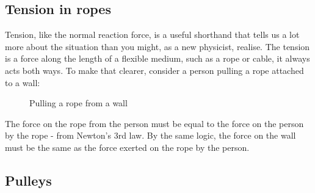 \subsection{Tension in ropes}
Tension, like the normal reaction force, is a useful shorthand that tells us a lot more about the situation than you might, as a new physicist, realise. The tension is a force along the length of a flexible medium, such as a rope or cable, it always acts both ways. To make that clearer, consider a person pulling a rope attached to a wall:
\begin{figure}
    \centering
    
 \caption{Pulling a rope from a wall}
    \label{fig:pullarope}
\end{figure}
The force on the rope from the person must be equal to the force on the person by the rope - from Newton's 3rd law. By the same logic, the force on the wall must be the same as the force exerted on the rope by the person.

\subsection*{Pulleys}

